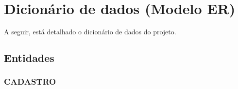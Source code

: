 \section{Dicionário de dados (Modelo ER)}

\vspace{5mm}

A seguir, está detalhado o dicionário de dados do projeto.


\subsection{Entidades}
\vspace{5mm}

\subsubsection{CADASTRO}
\label{cadastro}
